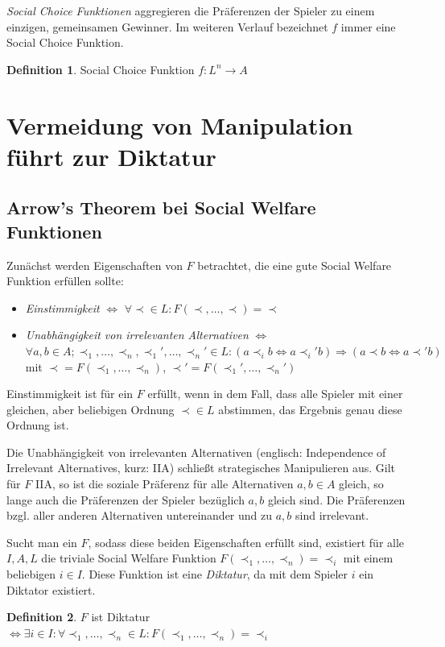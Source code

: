 \documentclass[a4paper,11pt]{article}
\theoremstyle{definition}
\newtheorem{definition}{Definition}
\theoremstyle{plain}
\theoremstyle{definition}
\begin{document}
\emph{Social Choice Funktionen} aggregieren die Präferenzen der Spieler zu einem einzigen, gemeinsamen Gewinner. Im weiteren Verlauf bezeichnet $f$ immer eine Social Choice Funktion.
\begin{definition}
	\label{def:socialchoicefunc}
	Social Choice Funktion $f : L^n \rightarrow A$
\end{definition}

\section{Vermeidung von Manipulation führt zur Diktatur}
\subsection{Arrow's Theorem bei Social Welfare Funktionen}
Zunächst werden Eigenschaften von $F$ betrachtet, die eine gute Social Welfare Funktion erfüllen sollte:
\begin{itemize}
	\item \emph{Einstimmigkeit} $\iff$ $\forall \prec \in L: F(\prec, \ldots,\prec) = \prec$
	\item \emph{Unabhängigkeit von irrelevanten Alternativen}
	$\iff$ $\forall a, b \in A; \prec_1,\ldots,\prec_n, \prec_1', \ldots, \prec_n' \in L:	(a\prec_i b \iff a\prec_i' b) \Rightarrow (a\prec b \iff a\prec' b)$	mit $\prec = F(\prec_1, \ldots, \prec_n)$, $\prec' = F(\prec_1', \ldots, \prec_n')$
\end{itemize}

Einstimmigkeit ist für ein $F$ erfüllt, wenn in dem Fall, dass alle Spieler mit einer gleichen, aber beliebigen Ordnung $\prec \in L$ abstimmen, das Ergebnis genau diese Ordnung ist. 

Die Unabhängigkeit von irrelevanten Alternativen (englisch: Independence of Irrelevant Alternatives, kurz: IIA) schließt strategisches Manipulieren aus. Gilt für $F$ IIA, so ist die soziale Präferenz für alle Alternativen $a, b \in A$ gleich, so lange auch die Präferenzen der Spieler bezüglich $a, b$ gleich sind. Die Präferenzen bzgl. aller anderen Alternativen untereinander und zu $a, b$ sind irrelevant.

Sucht man ein $F$, sodass diese beiden Eigenschaften erfüllt sind, existiert für alle $I, A, L$ die triviale Social Welfare Funktion $F(\prec_1, \ldots, \prec_n) = \prec_i$ mit einem beliebigen $i \in I$. Diese Funktion ist eine \emph{Diktatur}, da mit dem Spieler $i$ ein Diktator existiert. 

\begin{definition}
	\label{def:diktatur}
	$F$ ist Diktatur$\iff\exists i \in I: \forall \prec_1, \ldots, \prec_n \in L: F(\prec_1, \ldots, \prec_n) = \prec_i$
\end{definition}
\end{document}
